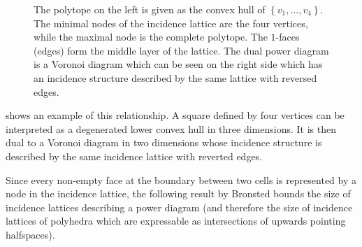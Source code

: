 \begin{figure}[tb]
    \caption{The polytope on the left is given as the convex hull of $\left\{ v_1, \dots, v_4 \right\}$.
    The minimal nodes of the incidence lattice are the four vertices, while the maximal node is the complete polytope. The $1$-faces (edges) form the middle layer of the lattice.
    The dual power diagram is a Voronoi diagram which can be seen on the right side which has an incidence structure described by the same lattice with reversed edges.}
    \label{fig:incidencelattice}
\end{figure}
 shows an example of this relationship.
A square defined by four vertices can be interpreted as a degenerated lower convex hull in three dimensions. It is then dual to a Voronoi diagram in two dimensions whose incidence structure is described by the same incidence lattice with reverted edges.

Since every non-empty face at the boundary between two cells is represented by a node in the incidence lattice, the following result by Bronsted \cite{brondsted2012introduction} bounds the size of incidence lattices describing a power diagram (and therefore the size of incidence lattices of polyhedra which are expressable as intersections of upwards pointing halfspaces).

